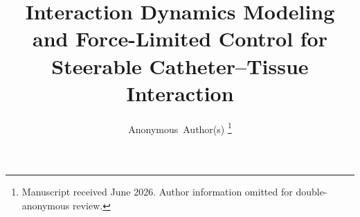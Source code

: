 \documentclass[journal]{IEEEtran}
\begin{document}
\title{Interaction Dynamics Modeling and Force-Limited Control for Steerable Catheter--Tissue Interaction}

\author{Anonymous~Author(s)%
\thanks{Manuscript received June 2026. Author information omitted for double-anonymous review.}%
}

\maketitle
\thispagestyle{empty}
\pagestyle{empty}


\end{document}
